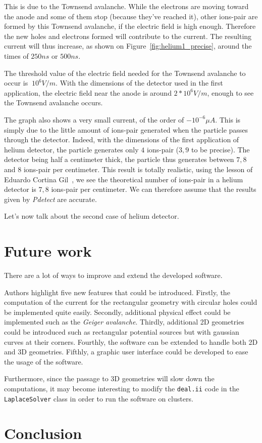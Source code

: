 \documentclass[11pt]{article}
\begin{document}
			This is due to the Townsend avalanche. While the electrons are moving toward the anode and some of them stop
			(because they've reached it), other ions-pair are formed by this Townsend avalanche, if the electric field is
			high enough. Therefore the new holes and electrons formed will contribute to the current. The resulting current
			will thus increase, as shown on Figure~\ref{fig:helium1_precise}, around the times of $250ns$ or $500ns$.

			The threshold value of the electric field needed for the Townsend avalanche to occur is $~10^6V/m$. With the
			dimensions of the detector used in the first application, the electric field near the anode is around
			$2*10^6V/m$, enough to see the Townsend avalanche occurs.

			The graph also shows a very small current, of the order of $-10^{-6}\mu A$. This is simply due to the little
			amount of ions-pair generated when the particle passes through the detector. Indeed, with the dimensions of the
			first application of helium detector, the particle generates only $4$ ions-pair ($3,9$ to be precise). The detector
			being half a centimeter thick, the particle thus generates between $7,8$ and $8$ ions-pair per centimeter.
			This result is totally realistic, using the lesson of Eduardo Cortina Gil~\cite{lphy2236}, we see the theoretical
			number of ions-pair in a helium detector is $7,8$ ions-pair per centimeter. We can therefore assume that the
			results given by \textit{Pdetect} are accurate.

			Let's now talk about the second case of helium detector.

\section{Future work}

There are a lot of ways to improve and extend the developed software.

Authors highlight five new features that could be introduced. Firstly, the
computation of the current for the
rectangular geometry with circular holes could be implemented quite easily.
Secondly, additional physical effect
could be implemented such as the \textit{Geiger avalanche}. Thirdly,
additional 2D geometries could be introduced such as
rectangular potential sources but with gaussian curves at their corners.
Fourthly, the software can be extended to handle both 2D and 3D geometries.
Fifthly, a graphic user interface could be developed to ease the usage of the
software.

Furthermore, since the passage to 3D geometries will slow down the computations,
it may become interesting to modify the \texttt{deal.ii} code in the
\texttt{LaplaceSolver} class in order to run the software on clusters. 

\section*{Conclusion}

\newpage



\end{document}
